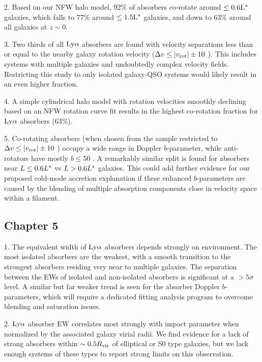 2. Based on our NFW halo model, 92\% of absorbers co-rotate around $\rm \leq 0.6 L^{\**}$ galaxies, which falls to 77\% around $\rm \leq 1.5 L^{\**}$ galaxies, and down to 63\% around all galaxies at $z \sim 0$.

3. Two thirds of all $\rm Ly\alpha$ absorbers are found with velocity separations less than or equal to the nearby galaxy rotation velocity ($\Delta v \leq \lvert v_{\rm rot} \rvert \pm 10$ \kms). This includes systems with multiple galaxies and undoubtedly complex velocity fields. Restricting this study to only isolated galaxy-QSO systems would likely result in an even higher fraction.

4. A simple cylindrical halo model with rotation velocities smoothly declining based on an NFW rotation curve fit results in the highest co-rotation fraction for $\rm Ly\alpha$ absorbers ($63\%$).

5. Co-rotating absorbers (when chosen from the sample restricted to $\Delta v \leq \lvert v_{\rm rot} \rvert \pm 10$ \kms) occupy a wide range in Doppler $b$-parameter, while anti-rotators have mostly $b \leq 50$ \kms. A remarkably similar split is found for absorbers near $L \leq 0.6 L^{\**}$ vs $L > 0.6 L^{\**}$ galaxies. This could add further evidence for our proposed cold-mode accretion explanation if these enhanced $b$-parameters are caused by the blending of multiple absorption components close in velocity space within a filament.


\subsection{Chapter 5}
1. The equivalent width of $\rm Ly\alpha$ absorbers depends strongly on environment. The most isolated absorbers are the weakest, with a smooth transition to the strongest absorbers residing very near to multiple galaxies. The separation between the EWs of isolated and non-isolated absorbers is significant at a $> 5\sigma$ level. A similar but far weaker trend is seen for the absorber Doppler $b$-parameters, which will require a dedicated fitting analysis program to overcome blending and saturation issues.

2. $\rm Ly\alpha$ absorber EW correlates most strongly with impact parameter when normalized by the associated galaxy virial radii. We find evidence for a lack of strong absorbers within $\sim 0.5 R_{\rm vir}$ of elliptical or S0 type galaxies, but we lack enough systems of these types to report strong limits on this observation.

